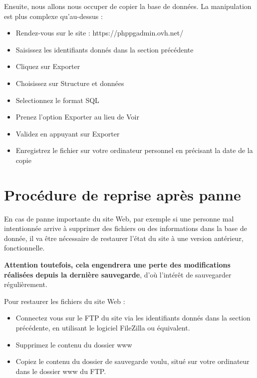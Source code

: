 \documentclass[11pt]{report}
\begin{document}
\par Ensuite, nous allons nous occuper de copier la base de données. La
manipulation est plus complexe qu'au-dessus : 
\begin{itemize}
  \item Rendez-vous sur le site : https://phppgadmin.ovh.net/
  \item Saisissez les identifiants donnés dans la section précédente
  \item Cliquez sur \og Exporter \fg{}
  \item Choisissez sur \og Structure et données \fg{}
  \item Selectionnez le format \og SQL \fg{}
  \item Prenez l'option \og Exporter \fg{} au lieu de \og Voir \fg{}
  \item Validez en appuyant sur \og Exporter \fg{}
  \item Enregistrez le fichier sur votre ordinateur personnel en précisant la
  date de la copie
\end{itemize}

\section{Procédure de reprise après panne}
En cas de panne importante du site Web, par exemple si une personne mal
intentionnée arrive à supprimer des fichiers ou des informations dans la base de
donnée, il va être nécessaire de restaurer l'état du site à une version
antérieur, fonctionnelle. \\
\par \textbf{Attention toutefois, cela engendrera une perte
des modifications réalisées depuis la dernière sauvegarde}, d'où l'intérêt de
sauvegarder régulièrement. \\

\par Pour restaurer les fichiers du site Web : 
\begin{itemize}
  \item Connectez vous sur le FTP du site via les identifiants donnés dans la
  section précédente, en utilisant le logiciel FileZilla ou équivalent.
  \item Supprimez le contenu du dossier \og www \fg{}
  \item Copiez le contenu du dossier de sauvegarde voulu, situé sur votre
  ordinateur dans le dossier \og www \fg{} du FTP. \\
\end{itemize} 
\end{document}
